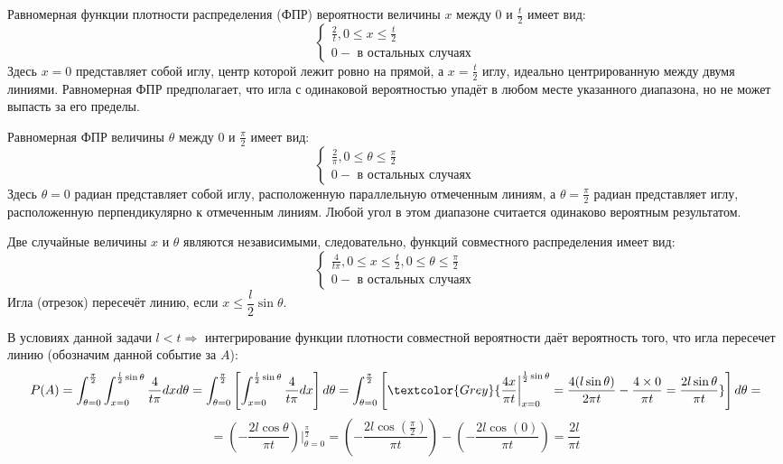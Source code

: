 Равномерная функции плотности распределения (ФПР) вероятности величины $x$ между 0 и $\frac{t}{2}$ имеет вид:
\[
\begin{cases}
	\frac{2}{t}, 0 \le x \le \frac{t}{2} \\
	0 - \text{ в остальных случаях}
\end{cases}
\]
Здесь $x=0$ представляет собой иглу, центр которой лежит ровно на прямой, а $x=\frac{t}{2}$ иглу, идеально центрированную между двумя линиями. Равномерная ФПР предполагает, что игла с одинаковой вероятностью упадёт в любом месте указанного диапазона, но не может выпасть за его пределы.
\begin{figure}[H]
\end{figure}
Равномерная ФПР величины $\theta$ между 0 и $\frac{\pi}{2}$ имеет вид:
\[
\begin{cases}
	\frac{2}{\pi}, 0 \le \theta \le \frac{\pi}{2} \\
	0 - \text{ в остальных случаях}
\end{cases}
\]
Здесь $\theta=0$ радиан представляет собой иглу, расположенную параллельную отмеченным линиям, а $\theta = \frac{\pi}{2}$ радиан представляет иглу, расположенную перпендикулярно к отмеченным линиям. Любой угол в этом диапазоне считается одинаково вероятным результатом.

Две случайные величины $x$ и $\theta$ являются независимыми, следовательно, функций совместного распределения имеет вид:
\[
\begin{cases}
	\frac{4}{t \pi}, 0 \le x \le \frac{t}{2}, 0 \le \theta \le \frac{\pi}{2} \\
	0 - \text{ в остальных случаях}
\end{cases}
\]
Игла (отрезок) пересечёт линию, если $x \le \dfrac{l}{2} \sin \theta$.

В условиях данной задачи $l < t \Rightarrow$ интегрирование функции плотности совместной вероятности даёт вероятность того, что игла пересечет линию (обозначим данной событие за $A$):
\[
P(A) = \int_{\theta = 0}^{\frac{\pi}{2}} \int_{x=0}^{\frac{l}{2} \sin \theta} \frac{4}{t \pi} dx d \theta =
\int_{\theta = 0}^{\frac{\pi}{2}} \left[ \int_{x=0}^{\frac{l}{2} \sin \theta} \frac{4}{t \pi} dx \right] d \theta =
\int_{\theta = 0}^{\frac{\pi}{2}} \left[ \textcolor{Grey}{ \frac{4x}{\pi t} \bigg|_{x=0}^{\frac{1}{2} \sin \theta} = \frac{4(l \sin \theta)}{2 \pi t} - \frac{4 \times 0}{\pi t} = \frac{2l \sin \theta}{\pi t} } \right] d \theta =
\]
\[
= \left( - \frac{2l \cos \theta}{\pi t} \right) \bigg|_{\theta = 0}^{\frac{\pi}{2}} = \left( - \frac{2 l \cos \left(\frac{\pi}{2}\right)}{\pi t} \right) - \left( - \frac{2 l \cos (0)}{\pi t} \right) = \frac{2l}{\pi t}
\]

